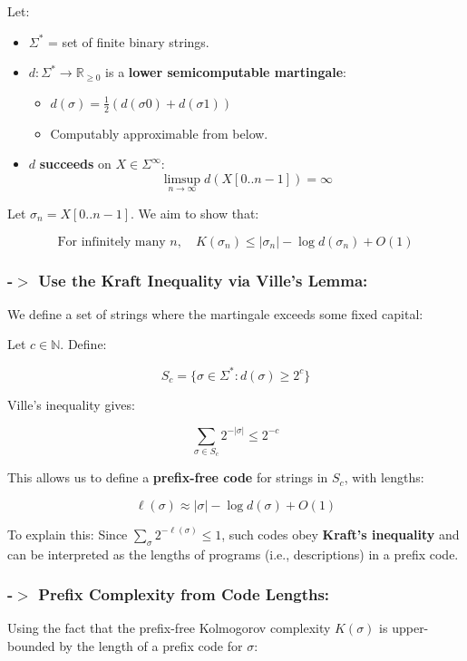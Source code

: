 \documentclass[12pt]{article}
\begin{document}
Let:
\begin{itemize}
  \item \( \Sigma^* \) = set of finite binary strings.
  \item \( d : \Sigma^* \to \mathbb{R}_{\geq 0} \) is a \textbf{lower semicomputable martingale}:
    \begin{itemize}
      \item \( d(\sigma) = \frac{1}{2}(d(\sigma 0) + d(\sigma 1)) \)
      \item Computably approximable from below.
    \end{itemize}
  \item \( d \) \textbf{succeeds} on \( X \in \Sigma^\infty \):
  \[
  \limsup_{n \to \infty} d(X[0..n-1]) = \infty
  \]
\end{itemize}

Let \( \sigma_n = X[0..n-1] \). We aim to show that:

\[
\text{For infinitely many } n, \quad K(\sigma_n) \leq |\sigma_n| - \log d(\sigma_n) + O(1)
\]

\subsubsection*{-$>$ Use the Kraft Inequality via Ville’s Lemma:}

We define a set of strings where the martingale exceeds some fixed capital:

Let \( c \in \mathbb{N} \). Define:

\[
S_c = \{ \sigma \in \Sigma^* : d(\sigma) \geq 2^c \}
\]

Ville’s inequality gives:

\[
\sum_{\sigma \in S_c} 2^{-|\sigma|} \leq 2^{-c}
\]

This allows us to define a \textbf{prefix-free code} for strings in \( S_c \), with lengths:

\[
\ell(\sigma) \approx |\sigma| - \log d(\sigma) + O(1)
\]

To explain this: Since \( \sum_{\sigma} 2^{-\ell(\sigma)} \leq 1 \), such codes obey \textbf{Kraft's inequality} and can be interpreted as the lengths of programs (i.e., descriptions) in a prefix code.

\subsubsection*{-$>$ Prefix Complexity from Code Lengths:}

Using the fact that the prefix-free Kolmogorov complexity \( K(\sigma) \) is upper-bounded by the length of a prefix code for \( \sigma \):
\end{document}
